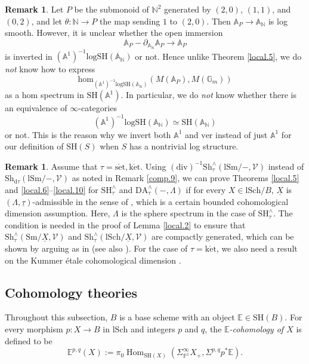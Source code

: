 \documentclass[10pt]{amsart}
\theoremstyle{definition}
\newtheorem{rmk}[thm]{Remark}
\theoremstyle{remark}
\numberwithin{equation}{subsection}
\newcommand{\A}{\mathbb{A}}
\newcommand{\E}{\mathbb{E}}
\newcommand{\G}{\mathbb{G}}
\newcommand{\N}{\mathbb{N}}
\renewcommand{\P}{\mathbb{P}}
\newcommand{\cV}{\mathcal{V}}
\DeclareMathOperator{\Hom}{Hom}
\newcommand{\ul}{\underline}
\newcommand{\Sm}{\mathrm{Sm}}
\newcommand{\SH}{\mathrm{SH}}
\newcommand{\logSH}{\mathrm{logSH}}
\newcommand{\map}{\mathrm{hom}}
\newcommand{\DA}{\mathrm{DA}}
\newcommand{\lSch}{\mathrm{lSch}}
\newcommand{\lSm}{\mathrm{lSm}}
\newcommand{\infShv}{\mathrm{Sh}}
\newcommand{\ver}{\mathrm{ver}}
\newcommand{\divi}{\mathrm{div}}
\newcommand{\dtau}{\mathrm{d}\tau}
\newcommand{\ketale}{\mathrm{k\acute{e}t}}
\newcommand{\setale}{\mathrm{s\acute{e}t}}
\begin{document}
\begin{rmk}
\label{local.14}
Let $P$ be the submonoid of $\N^2$ generated by $(2,0)$, $(1,1)$, and $(0,2)$, and let $\theta \colon \N\to P$ the map sending $1$ to $(2,0)$.
Then $\A_P\to \A_{\N}$ is log smooth.
However, it is unclear whether the open immersion
\[
\A_{P}-\partial_{\A_{\N}}\A_P\to \A_P
\]
is inverted in $(\A^1)^{-1}\logSH(\A_{\N})$ or not.
Hence unlike Theorem \ref{local.5}, we do \emph{not} know how to express
\[
\map_{(\A^1)^{-1}\logSH(\A_{\N})}(M(\A_P),M(\G_m))
\]
as a hom spectrum in $\SH(\A^1)$.
In particular, we do \emph{not} know whether there is an equivalence of $\infty$-categories
\[
(\A^1)^{-1}\logSH(\A_{\N})
\simeq
\SH(\A_{\N})
\]
or not.
This is the reason why we invert both $\A^1$ and $\ver$ instead of just $\A^1$ for our definition of $\SH(S)$ when $S$ has a nontrivial log structure.
\end{rmk}

\begin{rmk}
Assume that $\tau=\setale,\ketale$.
Using $(\divi)^{-1}\infShv_\tau^\wedge(\lSm/-,\cV)$ instead of  $\infShv_{\dtau}(\lSm/-,\cV)$ as noted in Remark \ref{comp.9},
we can prove Theorems \ref{local.5} and \ref{local.6}--\ref{local.10} for $\SH_\tau^\wedge$ and $\DA_\tau^\wedge(-,\Lambda)$
if for every $X\in \lSch/B$,
$\ul{X}$ is $(\Lambda,\ul{\tau})$-admissible in the sense of \cite[Definition 2.4.14(1)]{AGV},
which is a certain bounded cohomological dimension assumption.
Here, $\Lambda$ is the sphere spectrum in the case of $\SH_\tau^\wedge$.
The condition is needed in the proof of Lemma \ref{local.2} to ensure that $\infShv_\tau^\wedge(\Sm/\ul{X},\cV)$ and $\infShv_\tau^\wedge(\lSch/\ul{X},\cV)$ are compactly generated,
which can be shown by arguing as in \cite[Proposition 2.4.20(2)]{AGV} (see also \cite[Remark 2.4.23]{AGV}).
For the case of $\tau=\ketale$,
we also need a result on the Kummer \'etale cohomological dimension \cite[Proposition 5.3]{Nak}.
\end{rmk}

\subsection{Cohomology theories}
\label{cohomology}

Throughout this subsection, $B$ is a base scheme with an object $\E\in \SH(B)$.
For every morphism $p\colon X\to B$ in $\lSch$ and integers $p$ and $q$, the \emph{$\E$-cohomology of $X$} is defined to be
\begin{equation}
\E^{p,q}(X)
:=
\pi_0\Hom_{\SH(X)}(\Sigma_{\P^1}^\infty X_+,\Sigma^{p,q} p^*\E).
\end{equation}
\end{document}
